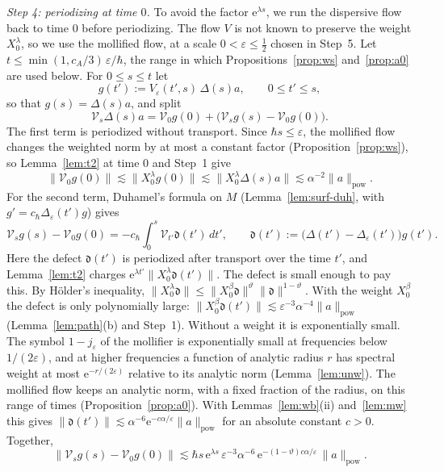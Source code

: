 \documentclass[twoside,10pt]{article}
\numberwithin{equation}{section}
\theoremstyle{slbody}
\theoremstyle{remark}
\newcommand{\norm}[1]{\lVert #1\rVert}
\newcommand{\ue}{\mathrm{e}}
\newcommand{\pwNorm}[1]{\norm{#1}_{\mathrm{pow}}}
\begin{document}
\emph{Step 4: periodizing at time $0$.} To avoid the factor $\ue^{\lambda s}$, we run the dispersive flow back to time $0$ before
periodizing. The flow $V$ is not known to preserve the weight $X_0^\lambda$, so we use the mollified flow, at a scale
$0<\varepsilon\le\tfrac12$ chosen in Step~5. Let $t\le\min(1,c_A/3)\,\varepsilon/\hbar$, the range in which Propositions~\ref{prop:ws} and~\ref{prop:a0} are used below. For
$0\le s\le t$ let
\[
  g(t'):=V_\varepsilon(t',s)\,\Delta(s)a,\qquad0\le t'\le s,
\]
so that $g(s)=\Delta(s)a$, and split
\[
  \mathcal V_s\Delta(s)a=\mathcal V_0g(0)+\bigl(\mathcal V_sg(s)-\mathcal V_0g(0)\bigr).
\]
The first term is periodized without transport. Since $\hbar s\le\varepsilon$, the mollified flow changes the weighted norm by at most a
constant factor (Proposition~\ref{prop:ws}), so Lemma~\ref{lem:t2} at time $0$ and Step~1 give
\[
  \norm{\mathcal V_0g(0)}\lesssim\norm{X_0^\lambda g(0)}\lesssim\norm{X_0^\lambda\Delta(s)a}\lesssim\alpha^{-2}\pwNorm a .
\]
For the second term, Duhamel's formula on $M$ (Lemma~\ref{lem:surf-duh}, with $g'=c_\hbar\Delta_\varepsilon(t')g$) gives
\[
  \mathcal V_sg(s)-\mathcal V_0g(0)=-c_\hbar\int_0^s\mathcal V_{t'}\mathfrak d(t')\,dt',\qquad
  \mathfrak d(t'):=\bigl(\Delta(t')-\Delta_\varepsilon(t')\bigr)g(t').
\]
Here the defect $\mathfrak d(t')$ is periodized after transport over the time $t'$, and Lemma~\ref{lem:t2} charges
$\ue^{\lambda t'}\norm{X_0^\lambda\mathfrak d(t')}$. The defect is small enough to pay this. By H\"older's inequality,
$\norm{X_0^\lambda\mathfrak d}\le\norm{X_0^\beta\mathfrak d}^\vartheta\norm{\mathfrak d}^{1-\vartheta}$. With the weight $X_0^\beta$ the defect is only
polynomially large: $\norm{X_0^\beta\mathfrak d(t')}\lesssim\varepsilon^{-3}\alpha^{-4}\pwNorm a$ (Lemma~\ref{lem:path}(b) and Step~1).
Without a weight it is exponentially small. The symbol $1-j_\varepsilon$ of the mollifier is exponentially small at frequencies below
$1/(2\varepsilon)$, and at higher frequencies a function of analytic radius $r$ has spectral weight at most $\ue^{-r/(2\varepsilon)}$
relative to its analytic norm (Lemma~\ref{lem:unw}). The mollified flow keeps an analytic norm, with a fixed fraction of the radius,
on this range of times (Proposition~\ref{prop:a0}). With Lemmas~\ref{lem:wb}(ii) and~\ref{lem:mw} this gives
$\norm{\mathfrak d(t')}\lesssim\alpha^{-6}\ue^{-c\alpha/\varepsilon}\pwNorm a$ for an absolute constant $c>0$. Together,
\[
  \norm{\mathcal V_sg(s)-\mathcal V_0g(0)}\lesssim\hbar s\,\ue^{\lambda s}\,\varepsilon^{-3}\alpha^{-6}\,\ue^{-(1-\vartheta)c\alpha/\varepsilon}\,\pwNorm a .
\]
\end{document}
